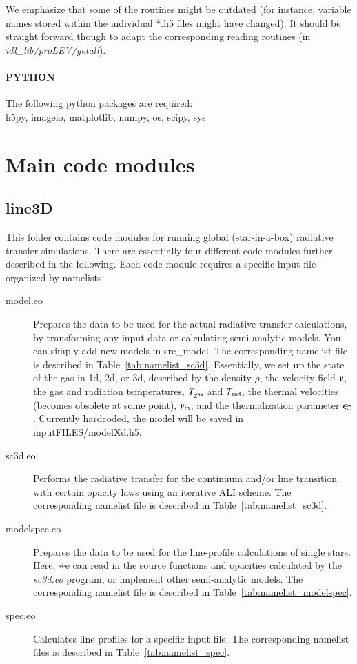 \documentclass[10pt,a4paper]{article}
\begin{document}
We emphasize that some of the routines might be outdated (for
instance, variable names stored within the individual *.h5 files might
have changed). It should be straight forward though to adapt the
corresponding reading routines (in \textit{idl\_lib/proLEV/getall}).
%
\paragraph{PYTHON}
The following python packages are required: \\
h5py, imageio, matplotlib, numpy, os, scipy, sys
%
%
%
\section{Main code modules}
\subsection{line3D}
\label{subsec:line3d}
This folder contains code modules for running global (star-in-a-box)
radiative transfer simulations. There are essentially four different
code modules further described in the following. Each code module
requires a specific input file organized by namelists.

\begin{description}
\item[model.eo] Prepares the data to be used for the actual radiative
  transfer calculations, by transforming any input data or calculating
  semi-analytic models. You can simply add new models in
  src\_model. The corresponding namelist file is described in
  Table~\ref{tab:namelist_sc3d}. Essentially, we set up the state of
  the gas in 1d, 2d, or 3d, described by the density $\rho$, the
  velocity field $\boldsymbol{v}$, the gas and radiation temperatures,
  $T_{\rm gas}$ and $T_{\rm rad}$, the thermal velocities (becomes obsolete at some
  point), $v_{\rm th}$, and the thermalization parameter $\epsilon_{\rm C}$. Currently hardcoded, the model will be saved in
  inputFILES/modelXd.h5.
\item[sc3d.eo] Performs the radiative transfer for the continuum
  and/or line transition with certain opacity laws using an iterative
  ALI scheme. The corresponding namelist file is described in
  Table~\ref{tab:namelist_sc3d}.
\item[modelspec.eo] Prepares the data to be
  used for the line-profile calculations of single stars. Here, we can
  read in the source functions and opacities calculated by the
  \textit{sc3d.eo} program, or implement other semi-analytic
  models. The corresponding namelist file is described in
  Table~\ref{tab:namelist_modelspec}.
\item[spec.eo] Calculates line profiles for a specific input file. The
  corresponding namelist files is described in
  Table~\ref{tab:namelist_spec}.
\end{description}
%
%
%
\end{document}
